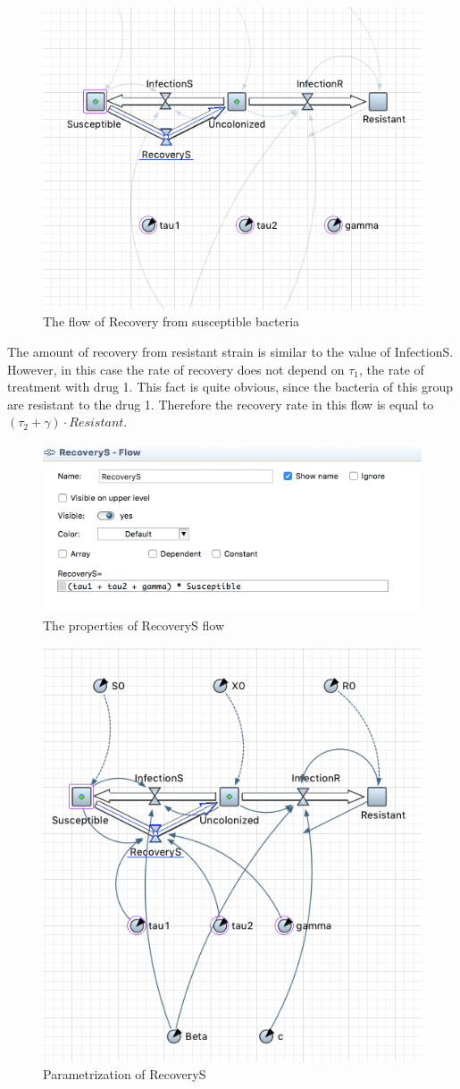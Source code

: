 \begin{figure}[H]
  \centering
  \includegraphics[height=0.5\textwidth]{img/screens/recovery/recovery6}
  \caption{The flow of Recovery from susceptible bacteria}
\end{figure}

The amount of recovery from resistant strain is similar to the value of InfectionS. However, in this case the rate of recovery does not depend on $\tau_1$, the rate of treatment with drug 1. This fact is quite obvious, since the bacteria of this group are resistant to the drug 1. Therefore the recovery rate in this flow is equal to $(\tau_2 + \gamma) \cdot Resistant$.

\begin{figure}[H]
  \centering
  \includegraphics[height=0.3\textwidth]{img/screens/recovery/recovery5}
  \caption{The properties of RecoveryS flow}
\end{figure}

\begin{figure}[H]
  \centering
  \includegraphics[height=0.6\textwidth]{img/screens/recovery/recovery7}
  \caption{Parametrization of RecoveryS}
\end{figure}

